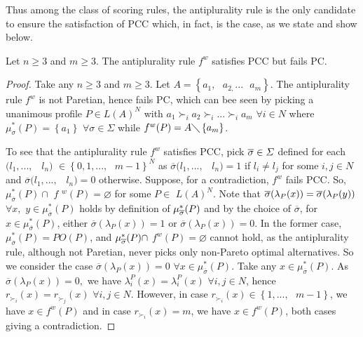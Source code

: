 \documentclass[version=3.21, pagesize, twoside=off, bibliography=totoc, DIV=calc, fontsize=12pt, a4paper]{scrartcl}
\begin{document}
Thus among the class of scoring rules, the antiplurality rule is the only
candidate to ensure the satisfaction of PCC which, in fact, is the case, as
we state and show below.

\begin{proposition}
Let $n\geq 3$ and $m\geq 3.$ The antiplurality rule $f^w$ satisfies PCC
but fails PC.
\end{proposition}

\begin{proof}
Take any $n\geq 3$ and $m\geq 3.$ Let $A=\left\{ a_{1},\text{ }a_{2,}...%
\text{ }a_{m}\right\} $. The antiplurality rule $f^w$ is not Paretian,
hence fails PC, which can bee seen by picking a unanimous profile $P\in
L(A)^{N}$ with $a_{1}\succ _{i}a_{2}\succ _{i}...\succ _{i}a_{m}$ $\forall
i\in N$ where $\mu _{\sigma }^{\ast }(P)=\left\{ a_{1}\right\} $ $\forall
\sigma \in \Sigma $ while $f^w(P)=A\diagdown \left\{ a_{m}\right\} $.

To see that the antiplurality rule $f^w$ satisfies PCC, pick $\overline{%
\sigma }\in \Sigma $ defined for each $(l_{1},...,$ \ $l_{n})$ $\in \left\{
0,1,...,\text{ }m-1\right\} ^{N}$ as $\overline{\sigma }(l_{1},...,$ \ $%
l_{n})=1$ if $l_{i}\neq l_{j}$ for some $i,j\in N$ and $\overline{\sigma }%
(l_{1},...,$ \ $l_{n})=0$ otherwise. Suppose, for a contradiction, $f^w$
fails PCC. So, $\mu _{\overline{\sigma }}^{\ast }(P)\cap $ $f$ $%
^{w}(P)=\varnothing $ for some $P\in $ $L(A)^{N}$. Note that $\overline{%
\sigma }(\lambda _{P}(x))=\overline{\sigma }(\lambda _{P}(y))$ $\forall x,$ $%
y\in \mu _{\overline{\sigma }}^{\ast }(P)$ holds by definition of $\mu _{%
\overline{\sigma }}^{\ast }(P)$ and by the choice of $\overline{\sigma }$,
for $x\in \mu _{\overline{\sigma }}^{\ast }(P)$, either $\overline{\sigma }%
(\lambda _{P}(x))=1$ or $\overline{\sigma }(\lambda _{P}(x))=0$. In the
former case, $\mu _{\overline{\sigma }}^{\ast }(P)=PO(P)$, and $\mu _{%
\overline{\sigma }}^{\ast }(P)\cap $ $f^w(P)=\varnothing $ cannot hold,
as the antiplurality rule, although not Paretian, never picks only
non-Pareto optimal alternatives. So we consider the case $\overline{\sigma }%
(\lambda _{P}(x))=0$ $\forall x\in \mu _{\overline{\sigma }}^{\ast }(P)$.
Take any $x\in \mu _{\overline{\sigma }}^{\ast }(P)$. As $\overline{\sigma }%
(\lambda _{P}(x))=0,$ we have $\lambda _{i}^{P}(x)=\lambda _{i}^{P}(x)$ $%
\forall i,j\in N$, hence $r_{\succ _{i}}(x)=r_{\succ _{j}}(x)$ $\forall
i,j\in N$. However, in case $r_{\succ _{i}}(x)\in \left\{ 1,...,\text{ }%
m-1\right\} $, we have $x\in f^w(P)$ and in case $r_{\succ _{i}}(x)=m$,
we have $x\in f^w(P)$, both cases giving a contradiction.
\end{proof}
\end{document}
